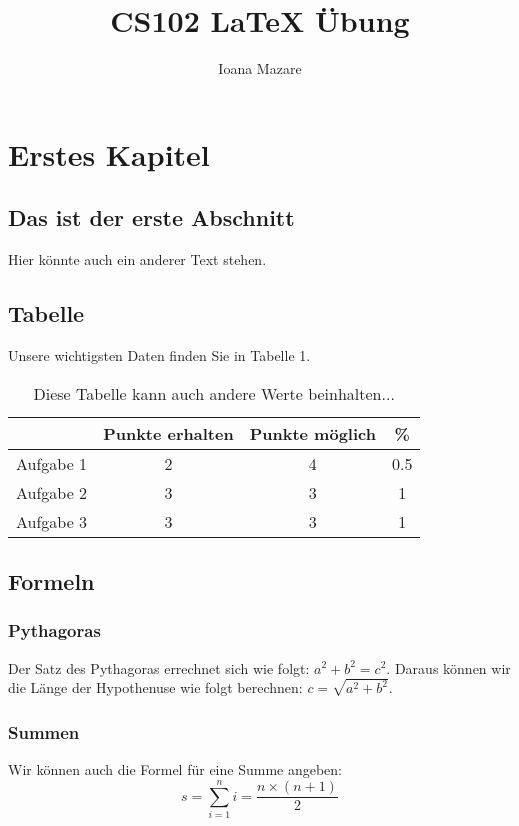 \documentclass[11pt,a4paper]{book}
\begin{document}
\title{CS102 \LaTeX \hspace{1pt} \"Ubung}
\author{Ioana Mazare}
\maketitle

\chapter{Erstes Kapitel}
\section{Das ist der erste Abschnitt}
Hier k\"onnte auch ein anderer Text stehen.

\section{Tabelle}
Unsere wichtigsten Daten finden Sie in Tabelle 1.
\begin{table}[h]
\centering
\begin{tabular}{c|c|c|c}
 & Punkte erhalten & Punkte m\"oglich & \% \\
\hline
Aufgabe 1 & 2 & 4 & 0.5 \\
Aufgabe 2 & 3 & 3 & 1 \\
Aufgabe 3 & 3 & 3 & 1 \\
\end{tabular}
\caption{Diese Tabelle kann auch andere Werte beinhalten...}
\end{table}

\section{Formeln}
\subsection{Pythagoras}
Der Satz des Pythagoras errechnet sich wie folgt: $a^{2}+b^{2}=c^{2}$.
Daraus k\"onnen wir die L\"ange der Hypothenuse wie folgt berechnen: $c=\sqrt{a^{2}+b^{2}}$.

\subsection{Summen}
Wir k\"onnen auch die Formel f\"ur eine Summe angeben:
\begin{equation}
s=\sum_{i=1}^{n} i=\frac{n\times(n+1)}{2}
\end{equation}
\end{document}
